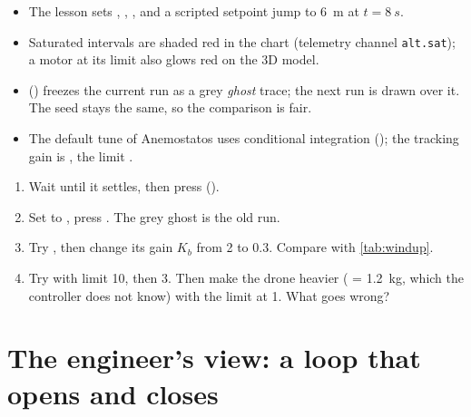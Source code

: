 \begin{inapp}
\begin{itemize}[leftmargin=1.2em]
  \item The lesson sets , , , and a scripted setpoint jump to \SI{6}{m} at $t = \SI{8}{s}$.
  \item Saturated intervals are shaded red in the  chart (telemetry channel \texttt{alt.sat}); a motor at its limit also glows red on the 3D model.
  \item {} () freezes the current run as a grey \emph{ghost} trace; the next run is drawn over it. The seed stays the same, so the comparison is fair.
  \item The default tune of Anemostatos uses conditional integration (); the tracking gain is , the limit .
\end{itemize}
\end{inapp}

\begin{trythis}
\begin{enumerate}
  \item Wait until it settles, then press  ().
  \item Set  to , press . The grey ghost is the old run.
  \item Try , then change its gain $K_b$ from 2 to 0.3. Compare with \cref{tab:windup}.
  \item Try  with limit 10, then 3. Then make the drone heavier ( = \SI{1.2}{kg}, which the controller does not know) with the limit at 1. What goes wrong?
\end{enumerate}
\end{trythis}

\section{The engineer's view: a loop that opens and closes}

